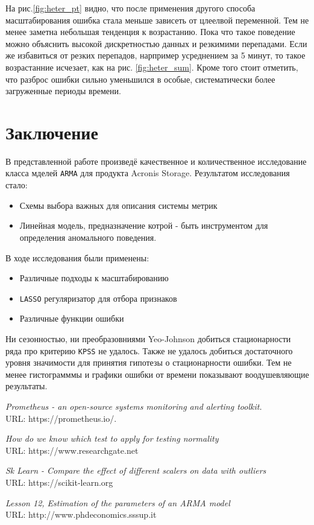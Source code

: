 \documentclass[14pt, a4paper]{extarticle}
\begin{document}
На рис.\ref{fig:heter_pt} видно, что после применения другого способа масштабирования ошибка стала меньше зависеть от цлеелвой переменной.
Тем не менее заметна небольшая тенденция к возрастанию. Пока что такое поведение можно объяснить высокой дискретностью данных и резкимими перепадами. Если же избавиться от резких перепадов, нарпример усреднением за 5 минут, то такое возрастанние исчезает, как на рис. \ref{fig:heter_sum}. Кроме того стоит отметить, что разброс ошибки сильно уменьшился в особые, систематически более загруженные периоды времени.


\section{Заключение}

В представленной работе произведё качественное и количественное исследование класса мделей \texttt{ARMA} для продукта Acronis Storage.
Результатом исследования стало:
\begin{itemize}
\item Схемы выбора важных для описания системы метрик
\item Линейная модель, предназначение котрой - быть инструментом для определения аномального поведения.
\end{itemize}

В ходе исследования были применены:
\begin{itemize}
\item Различные подходы к масштабированию
\item \texttt{LASSO} регуляризатор для отбора признаков
\item Различные функции ошибки
\end{itemize}

Ни сезонностью, ни преобразовниями Yeo-Johnson добиться стационарности ряда про критерию \texttt{KPSS} не удалось.
Также не удалось добиться достаточного уровня значимости для принятия гипотезы о стационарности ошибки.
Тем не менее гистограмммы и графики ошибки от времени показывают воодушевляющие результаты.
	
	\begin{thebibliography}{228}
	
		\emph{Prometheus - an open-source systems monitoring and alerting toolkit.} \\
		URL: https://prometheus.io/.
		
		\emph{How do we know which test to apply for testing normality} \\
		URL: https://www.researchgate.net
		
		\emph{Sk Learn - Compare the effect of different scalers on data with outliers} \\
		URL: https://scikit-learn.org	
		
		\emph{Lesson 12,  Estimation of the parameters of an ARMA model} \\
		URL: http://www.phdeconomics.sssup.it
		
		\end{thebibliography}
			
\end{document}
